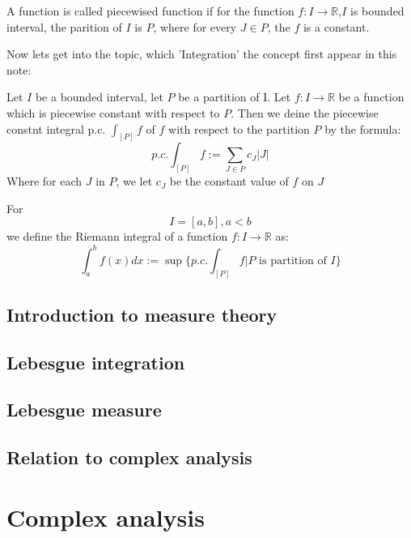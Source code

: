 \documentclass{article}
\newcommand{\R}{\mathbb{R}}
\begin{document}
\begin{definition}
	A function is called piecewised function if for the function $f:I\to \R$,$I$ is bounded interval, the parition of $I$ is $P$, where for every $J\in P$, the $f$ is a constant. 
\end{definition}

Now lets get into the topic, which 'Integration' the concept first appear in this note:
\begin{definition}
	Let $I$ be a bounded interval, let $P$ be a partition of I. Let $f:I\to \R$ be a function which is piecewise constant with respect to $P$. Then we deine the piecewise constnt integral p.c. $\int_{[P]}f$ of $f$ with respect to the partition $P$ by the formula:
	\begin{equation*}
		p.c.\int_{[P]}f:=\sum_{J\in P}c_J|J|
	\end{equation*}
	Where for each $J$ in $P$, we let $c_J$ be the constant value of $f$ on $J$
\end{definition}


\begin{definition}
  For $$I=[a,b], a<b$$ we define the Riemann integral of a function $f:I\to \R$ as:
  \begin{equation}
    \int_a^b f(x)dx:=\sup\{p.c.\int_{[P]}f|P \text{ is partition of } I\} 
  \end{equation}
\end{definition}




\subsection{Introduction to measure theory}
\subsection{Lebesgue integration}
\subsection{Lebesgue measure}
\subsection{Relation to complex analysis}



\section{Complex analysis}
\end{document}
